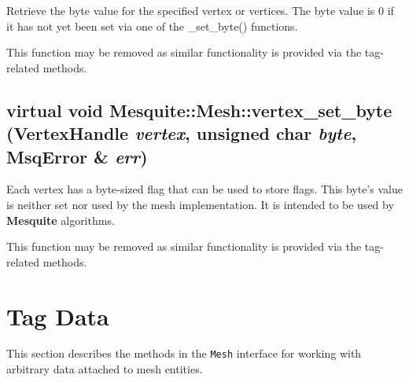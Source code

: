 Retrieve the byte value for the specified vertex or vertices. The byte value is 0 if it has not yet been set via one of the \_\-set\_\-byte() functions. 

This function may be removed as similar functionality is provided via the tag-related methods.

\subsection{\setlength{\rightskip}{0pt plus 5cm}virtual void Mesquite::Mesh::vertex\_\-set\_\-byte (Vertex\-Handle {\em vertex}, unsigned char {\em byte}, {\bf Msq\-Error} \& {\em err})\hspace{0.3cm}{\tt  [pure virtual]}}\label{classMesquite_1_1Mesh_a11}


Each vertex has a byte-sized flag that can be used to store flags. This byte's value is neither set nor used by the mesh implementation. It is intended to be used by {\bf Mesquite} algorithms.  

This function may be removed as similar functionality is provided via the tag-related methods.

\section{Tag Data}

This section describes the methods in the \texttt{Mesh} interface for working with arbitrary data attached to mesh entities.

